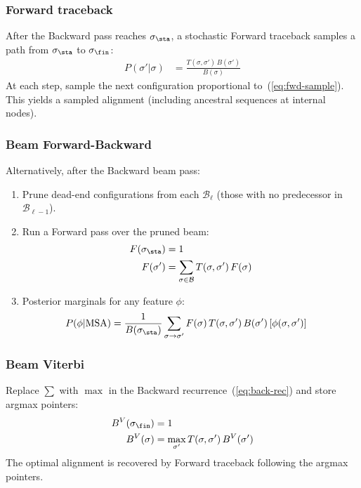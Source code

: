 \subsubsection{Forward traceback}

After the Backward pass reaches $\sigma_{\sta}$, a stochastic Forward traceback
samples a path from $\sigma_{\sta}$ to $\sigma_{\fin}$:
\begin{align}
P(\sigma' | \sigma) &= \frac{T(\sigma,\sigma')\, B(\sigma')}{B(\sigma)} \label{eq:fwd-sample}
\end{align}
At each step, sample the next configuration proportional to~(\ref{eq:fwd-sample}).
This yields a sampled alignment (including ancestral sequences at internal nodes).

\subsubsection{Beam Forward-Backward}

Alternatively, after the Backward beam pass:
\begin{enumerate}
\item Prune dead-end configurations from each $\mathcal{B}_\ell$
  (those with no predecessor in $\mathcal{B}_{\ell-1}$).
\item Run a Forward pass over the pruned beam:
\begin{align}
F(\sigma_{\sta}) &= 1 \label{eq:fwd-base}\\
F(\sigma') &= \sum_{\sigma \in \mathcal{B}} T(\sigma,\sigma')\, F(\sigma) \label{eq:fwd-rec}
\end{align}
\item Posterior marginals for any feature $\phi$:
\begin{align}
P(\phi | \mbox{MSA}) &= \frac{1}{B(\sigma_{\sta})} \sum_{\sigma \to \sigma'} F(\sigma)\, T(\sigma,\sigma')\, B(\sigma')\, [\phi(\sigma,\sigma')] \label{eq:fb-posterior}
\end{align}
\end{enumerate}

\subsubsection{Beam Viterbi}

Replace $\sum$ with $\max$ in the Backward recurrence~(\ref{eq:back-rec})
and store argmax pointers:
\begin{align}
B^V(\sigma_{\fin}) &= 1 \label{eq:vit-base}\\
B^V(\sigma) &= \max_{\sigma'} T(\sigma,\sigma')\, B^V(\sigma') \label{eq:vit-rec}
\end{align}
The optimal alignment is recovered by Forward traceback following the argmax pointers.

